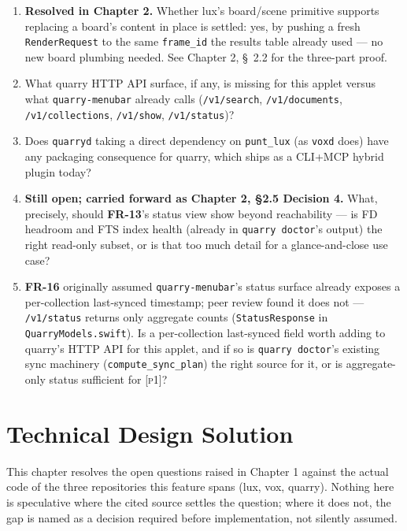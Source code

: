\documentclass[a4paper,11pt]{report}
\newcommand{\fr}[1]{\textbf{FR-#1}}
\newcommand{\pone}{\textsc{[p1]}}
\begin{document}
\begin{enumerate}
  \item \textbf{Resolved in Chapter 2.} Whether lux's board/scene
    primitive supports replacing a board's content in place is settled:
    yes, by pushing a fresh \texttt{RenderRequest} to the same
    \texttt{frame\_id} the results table already used --- no new board
    plumbing needed. See Chapter 2, \S\ 2.2 for the three-part proof.
  \item What quarry HTTP API surface, if any, is missing for this applet
    versus what \texttt{quarry-menubar} already calls
    (\texttt{/v1/search}, \texttt{/v1/documents}, \texttt{/v1/collections},
    \texttt{/v1/show}, \texttt{/v1/status})?
  \item Does \texttt{quarryd} taking a direct dependency on
    \texttt{punt\_lux} (as \texttt{voxd} does) have any packaging
    consequence for quarry, which ships as a CLI+MCP hybrid plugin today?
  \item \textbf{Still open; carried forward as Chapter 2, \S2.5 Decision
    4.} What, precisely, should \fr{13}'s status view show beyond
    reachability --- is FD headroom and FTS index health (already in
    \texttt{quarry doctor}'s output) the right read-only subset, or is
    that too much detail for a glance-and-close use case?
  \item \label{sec:openq-lastsync} \fr{16} originally assumed
    \texttt{quarry-menubar}'s status surface already exposes a
    per-collection last-synced timestamp; peer review found it does not
    --- \texttt{/v1/status} returns only aggregate counts
    (\texttt{StatusResponse} in \texttt{QuarryModels.swift}). Is a
    per-collection last-synced field worth adding to quarry's HTTP API
    for this applet, and if so is \texttt{quarry doctor}'s existing sync
    machinery (\texttt{compute\_sync\_plan}) the right source for it, or
    is aggregate-only status sufficient for \pone{}?
\end{enumerate}

\chapter{Technical Design Solution}

This chapter resolves the open questions raised in Chapter 1 against the
actual code of the three repositories this feature spans (lux, vox,
quarry). Nothing here is speculative where the cited source settles the
question; where it does not, the gap is named as a decision required
before implementation, not silently assumed.
\end{document}
